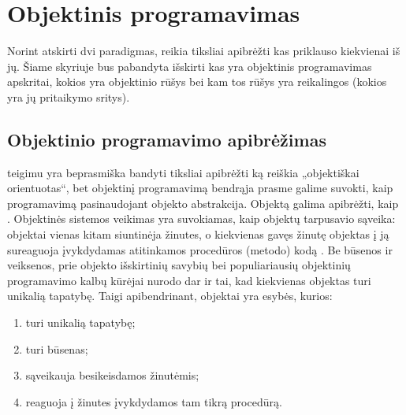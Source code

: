 \chapter{Objektinis programavimas}

Norint atskirti dvi paradigmas, reikia tiksliai apibrėžti kas priklauso
kiekvienai iš jų. Šiame skyriuje bus pabandyta išskirti kas yra
objektinis programavimas apskritai, kokios yra objektinio
rūšys bei kam tos rūšys yra reikalingos (kokios yra jų
pritaikymo sritys).

\section{Objektinio programavimo apibrėžimas}

\cite[225]{types-and-programming-languages} teigimu yra beprasmiška
bandyti tiksliai apibrėžti ką reiškia „objektiškai orientuotas“,
bet objektinį programavimą bendrąja prasme galime suvokti, kaip
programavimą pasinaudojant objekto abstrakcija. Objektą galima
apibrėžti, kaip \cite[41]{OOP-themes-and-variations}. Objektinės sistemos veikimas
yra suvokiamas, kaip objektų tarpusavio sąveika: objektai vienas kitam
siuntinėja žinutes, o kiekvienas gavęs žinutę objektas į ją sureaguoja
įvykdydamas atitinkamos procedūros (metodo)
kodą\cite[41]{OOP-themes-and-variations}%
\cite[277]{concepts-in-programming-languages}%
\cite[168]{Wegner:1987:DOL:38807.38823}.
Be būsenos ir veiksenos, prie objekto išskirtinių savybių 
\cite[37]{cs-beyond-object-oriented-programming} bei
populiariausių objektinių programavimo kalbų kūrėjai nurodo
dar ir tai, kad kiekvienas objektas turi unikalią tapatybę.
Taigi apibendrinant, objektai yra esybės, kurios:
\begin{enumerate}
  \item turi unikalią tapatybę;
  \item turi būsenas;
  \item sąveikauja besikeisdamos žinutėmis;
  \item reaguoja į žinutes įvykdydamos tam tikrą procedūrą.
\end{enumerate}

